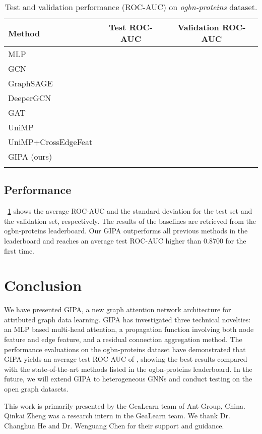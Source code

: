 \documentclass[sigconf]{acmart}
\newcommand{\model}{GIPA\xspace}
\begin{document}
\begin{table}[!h]
\caption{Test and validation performance (ROC-AUC) on \textit{ogbn-proteins} dataset.}
\begin{tabular}{lcc}
\hline
Method              & Test ROC-AUC  & Validation ROC-AUC \\ \hline
MLP                 &  &       \\
GCN                 &  &       \\
GraphSAGE           &  &       \\
DeeperGCN           &  &       \\
GAT                 &  &       \\
UniMP               &  &       \\
UniMP+CrossEdgeFeat &  &       \\
GIPA (ours)         &  &       \\ \hline
\label{tab:performance}
\end{tabular}
\end{table}
\subsection{Performance}
\tablename~\ref{tab:performance} shows the average ROC-AUC and the standard deviation for the test set and the validation set, respectively. The results of the baselines are retrieved from the ogbn-proteins leaderboard\footnotemark[1]. Our \model outperforms all previous methods in the leaderboard and reaches an average test ROC-AUC higher than 0.8700 for the first time.
% 
\section{Conclusion}
\label{sec:conclusion}
We have presented \model, a new graph attention network architecture for attributed graph data learning.
\model has investigated three technical novelties: an MLP based multi-head attention, a propagation function involving both node feature and edge feature, and a residual connection  aggregation method.
The performance evaluations on the ogbn-proteins dataset have demonstrated that \model yields an average test ROC-AUC of , showing the best results compared with the state-of-the-art methods listed in the ogbn-proteins leaderboard. In the future, we will extend \model to heterogeneous GNNs and conduct testing on the open graph datasets.  
\begin{acks}
This work is primarily presented by the GeaLearn team of Ant Group, China.
Qinkai Zheng was a research intern in the GeaLearn team.
We thank Dr. Changhua He and Dr. Wenguang Chen for their support and guidance. \end{acks}



\end{document}

